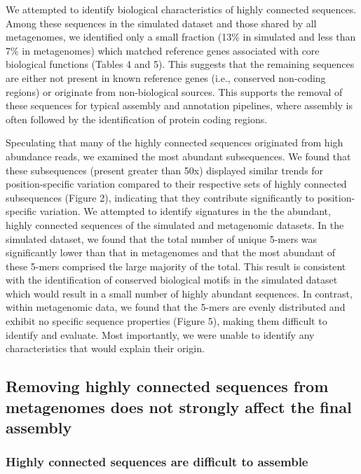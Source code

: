 \documentclass[10pt]{article}
\begin{document}
We attempted to identify biological characteristics of highly
connected sequences.  Among these sequences in the simulated dataset
and those shared by all metagenomes, we identified only a small
fraction (13\% in simulated and less than 7\% in metagenomes) which
matched reference genes associated with core biological functions
(Tables 4 and 5).  This suggests that the remaining sequences are
either not present in known reference genes (i.e., conserved
non-coding regions) or originate from non-biological sources.  This
supports the removal of these sequences for typical assembly and
annotation pipelines, where assembly is often followed by the
identification of protein coding regions.

Speculating that many of the highly connected sequences originated
from high abundance reads, we examined the most abundant subsequences.
We found that these subsequences (present greater than 50x) displayed
similar trends for position-specific variation compared to their
respective sets of highly connected subsequences (Figure 2),
indicating that they contribute significantly to position-specific
variation.  We attempted to identify signatures in the the abundant,
highly connected sequences of the simulated and metagenomic datasets.
In the simulated dataset, we found that the total number of unique
5-mers was significantly lower than that in metagenomes and that the
most abundant of these 5-mers comprised the large majority of the
total.  This result is consistent with the identification of conserved
biological motifs in the simulated dataset which would result in a
small number of highly abundant sequences.  In contrast, within
metagenomic data, we found that the 5-mers are evenly distributed and
exhibit no specific sequence properties (Figure 5), making them
difficult to identify and evaluate.  Most importantly, we were
unable to identify any characteristics that would explain their origin.


\subsection*{Removing highly connected sequences from metagenomes does not
strongly affect the final assembly}

\subsubsection*{Highly connected sequences are difficult to assemble}
\end{document}
